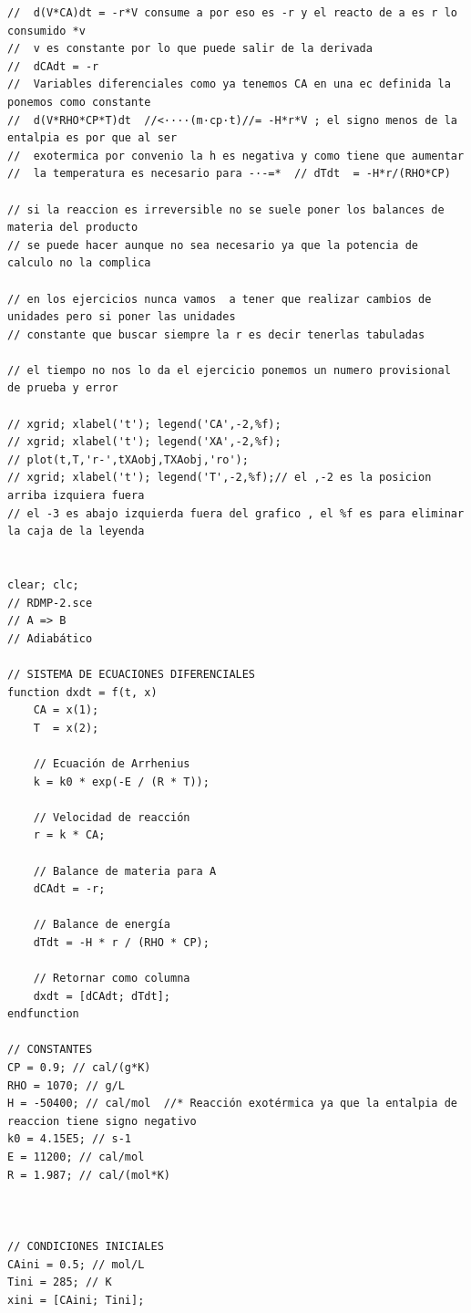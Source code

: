 \begin{verbatim}
//  d(V*CA)dt = -r*V consume a por eso es -r y el reacto de a es r lo consumido *v
//  v es constante por lo que puede salir de la derivada
//  dCAdt = -r  
//  Variables diferenciales como ya tenemos CA en una ec definida la ponemos como constante 
//  d(V*RHO*CP*T)dt  //<····(m·cp·t)//= -H*r*V ; el signo menos de la entalpia es por que al ser 
//  exotermica por convenio la h es negativa y como tiene que aumentar 
//  la temperatura es necesario para -·-=*  // dTdt  = -H*r/(RHO*CP)   

// si la reaccion es irreversible no se suele poner los balances de materia del producto 
// se puede hacer aunque no sea necesario ya que la potencia de calculo no la complica

// en los ejercicios nunca vamos  a tener que realizar cambios de unidades pero si poner las unidades
// constante que buscar siempre la r es decir tenerlas tabuladas

// el tiempo no nos lo da el ejercicio ponemos un numero provisional de prueba y error

// xgrid; xlabel('t'); legend('CA',-2,%f);
// xgrid; xlabel('t'); legend('XA',-2,%f);
// plot(t,T,'r-',tXAobj,TXAobj,'ro');
// xgrid; xlabel('t'); legend('T',-2,%f);// el ,-2 es la posicion arriba izquiera fuera
// el -3 es abajo izquierda fuera del grafico , el %f es para eliminar la caja de la leyenda


clear; clc;
// RDMP-2.sce
// A => B
// Adiabático

// SISTEMA DE ECUACIONES DIFERENCIALES
function dxdt = f(t, x)
    CA = x(1);
    T  = x(2);
    
    // Ecuación de Arrhenius
    k = k0 * exp(-E / (R * T));
    
    // Velocidad de reacción
    r = k * CA;
    
    // Balance de materia para A
    dCAdt = -r;
    
    // Balance de energía
    dTdt = -H * r / (RHO * CP);
    
    // Retornar como columna
    dxdt = [dCAdt; dTdt]; 
endfunction

// CONSTANTES
CP = 0.9; // cal/(g*K)
RHO = 1070; // g/L
H = -50400; // cal/mol  //* Reacción exotérmica ya que la entalpia de reaccion tiene signo negativo
k0 = 4.15E5; // s-1
E = 11200; // cal/mol
R = 1.987; // cal/(mol*K)



// CONDICIONES INICIALES
CAini = 0.5; // mol/L
Tini = 285; // K
xini = [CAini; Tini];


\end{verbatim}
